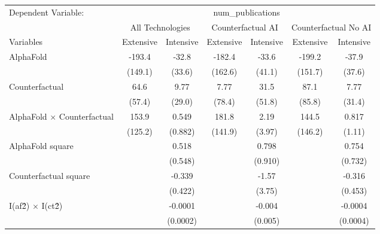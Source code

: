 \begingroup
\centering
\begin{tabular}{lcccccc}
   \tabularnewline \midrule \midrule
   Dependent Variable: & \multicolumn{6}{c}{num\_publications}\\
 & \multicolumn{2}{c}{All Technologies} & \multicolumn{2}{c}{Counterfactual AI} & \multicolumn{2}{c}{Counterfactual No AI} \\
\cmidrule(lr){1-1}\cmidrule(lr){2-3} \cmidrule(lr){4-5} \cmidrule(lr){6-7}
Variables & \multicolumn{1}{c}{Extensive} & \multicolumn{1}{c}{Intensive} & \multicolumn{1}{c}{Extensive} & \multicolumn{1}{c}{Intensive} & \multicolumn{1}{c}{Extensive} & \multicolumn{1}{c}{Intensive} \\
\cmidrule(lr){1-1}\cmidrule(lr){2-2} \cmidrule(lr){3-3} \cmidrule(lr){4-4} \cmidrule(lr){5-5} \cmidrule(lr){6-6} \cmidrule(lr){7-7}
   AlphaFold                          & -193.4    & -32.8     & -182.4    & -33.6     & -199.2    & -37.9\\   
                                      & (149.1)   & (33.6)    & (162.6)   & (41.1)    & (151.7)   & (37.6)\\   
   Counterfactual                     & 64.6      & 9.77      & 7.77      & 31.5      & 87.1      & 7.77\\   
                                      & (57.4)    & (29.0)    & (78.4)    & (51.8)    & (85.8)    & (31.4)\\   
   AlphaFold $\times$ Counterfactual  & 153.9     & 0.549     & 181.8     & 2.19      & 144.5     & 0.817\\   
                                      & (125.2)   & (0.882)   & (141.9)   & (3.97)    & (146.2)   & (1.11)\\   
   AlphaFold square                   &           & 0.518     &           & 0.798     &           & 0.754\\   
                                      &           & (0.548)   &           & (0.910)   &           & (0.732)\\   
   Counterfactual square              &           & -0.339    &           & -1.57     &           & -0.316\\   
                                      &           & (0.422)   &           & (3.75)    &           & (0.453)\\   
   I(af\^2) $\times$ I(ct\^2)         &           & -0.0001   &           & -0.004    &           & -0.0004\\   
                                      &           & (0.0002)  &           & (0.005)   &           & (0.0004)\\   

\end{tabular}

